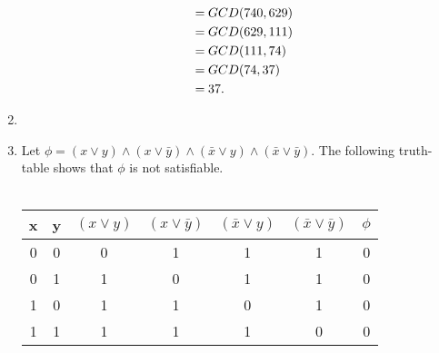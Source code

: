 \documentclass[11pt]{article}
\begin{document}
\begin{enumerate}[7.1]
\begin{enumerate}
\begin{align*}
      =\hspace{0.25em} & GCD(740, 629)   & \\
      =\hspace{0.25em} & GCD(629, 111)   & \\
      =\hspace{0.25em} & GCD(111, 74)    & \\
      =\hspace{0.25em} & GCD(74, 37)     & \\
      =\hspace{0.25em} & 37.
    \end{align*}
  \end{enumerate}
  \item
  \item Let $\phi = (x \lor y) \land (x \lor \bar{y}) \land (\bar{x} \lor y) \land (\bar{x} \lor \bar{y})$. The following truth-table shows that $\phi$ is not satisfiable. \\\\
    \begin{tabular}{|c|c|c|c|c|c|c|} \hline
      x & y & $(x \lor y)$ & $(x \lor \bar{y})$ & $(\bar{x} \lor y)$ & $(\bar{x} \lor \bar{y})$ & $\phi$ \\ \hline
      0 & 0 & 0            & 1                  & 1                  & 1                        & 0      \\ \hline
      0 & 1 & 1            & 0                  & 1                  & 1                        & 0      \\ \hline
      1 & 0 & 1            & 1                  & 0                  & 1                        & 0      \\ \hline
      1 & 1 & 1            & 1                  & 1                  & 0                        & 0      \\ \hline
    \end{tabular} \\
\end{enumerate}
\end{document}
